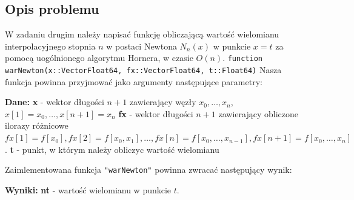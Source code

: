 \documentclass{article}
\begin{document}
\begin{center}
    \subsection{Opis problemu}
     \large W zadaniu drugim należy napisać funkcję obliczającą wartość wielomianu interpolacyjnego stopnia \(n\) w postaci Newtona
      \(N_{n}(x)\) w punkcie \(x = t\) za pomocą uogólnionego algorytmu Hornera, w czasie \(O(n)\). \newline
      \texttt{function warNewton(x::Vector{Float64}, fx::Vector{Float64}, t::Float64)} \newline
       Nasza funkcja powinna przyjmować jako argumenty następujące parametry: \newline
      \begin{flushleft}
        \textbf{Dane:} \newline  
        \textbf{x} - wektor długości \(n + 1\) zawierający węzły \(x_{0}, \dots ,x_{n}\),   \(x[1] = x_{0},\dots,x[n+1]=x_{n}\) \newline
        \textbf{fx} - wektor długości \(n + 1\) zawierający obliczone ilorazy różnicowe \newline
        \(fx[1] = f[x_{0}], fx[2] = f[x_{0},x_{1}],\dots,fx[n] = f[x_{0},\dots,x_{n-1}], fx[n+1] = f[x_{0},\dots,x_{n}]\). \newline
        \textbf{t} - punkt, w którym należy obliczyc wartość wielomianu
     \end{flushleft}
     Zaimlementowana funkcja \texttt{"warNewton"} powinna zwracać następujący wynik: \newline
     \begin{flushleft}
        \textbf{Wyniki:} \newline  
        \textbf{nt} - wartość wielomianu w punkcie \(t\). 
     \end{flushleft}
 

\end{center}
\end{document}
